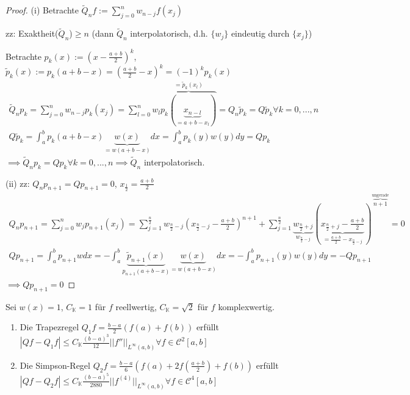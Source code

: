 \begin{proof}
	(i) Betrachte $\tilde{Q}_nf := \sum_{j=0}^{n} w_{n-j} f(x_j)$
	
	zz: Exaktheit($\tilde{Q}_n$)$\geq n$ (dann $\tilde{Q}_n$ interpolatorisch, d.h. $\{w_j\}$ eindeutig durch $\{x_j\}$)
	
	Betrachte $p_k(x) := \left(x - \frac{a+b}{2}\right)^k$, $\tilde{p}_k(x) := p_k(a+b-x) = \left(\frac{a+b}{2} - x\right)^k = (-1)^k p_k(x)$
	\begin{align*}
		\tilde{Q}_np_k = \sum_{j=0}^{n} w_{n-j}p_k(x_j) = \sum_{l=0}^{n} w_l \overbrace{p_k(\underbrace{x_{n-l}}_{=a+b-x_l})}^{=\tilde{p}_k(x_l)} = Q_n\tilde{p}_k = Q\tilde{p}_k \forall k=0, ..., n\\
		Q\tilde{p}_k = \int_{a}^{b} p_k(a+b-x) \underbrace{w(x)}_{=w(a+b-x)} dx = \int_{a}^{b} p_k(y) w(y) dy = Qp_k
	\end{align*}
	$\implies \tilde{Q}_np_k = Qp_k \forall k=0, ..., n \implies \tilde{Q}_n$ interpolatorisch.
	
	(ii) zz: $Q_np_{n+1} = Qp_{n+1} = 0$, $x_{\frac{1}{2}} = \frac{a+b}{2}$
	\begin{align*}
		Q_np_{n+1} = \sum_{j=0}^{n} w_j p_{n+1}(x_j) =
		\sum_{j=1}^{\frac{n}{2}} w_{\frac{n}{2} - j} (x_{\frac{n}{2} - j} - \frac{a+b}{2})^{n+1} +
		\sum_{j=1}^{\frac{n}{2}} \underbrace{w_{\frac{n}{2} + j}}_{w_{\frac{n}{2} - j}}
		\left( \underbrace{x_{\frac{n}{2} + j} - \frac{a+b}{2} }_{= \frac{a+b}{2} - x_{\frac{n}{2} - j}} \right)^{\overbrace{n+1}^{\text{ungerade}}} = 0\\
		Qp_{n+1} = \int_{a}^{b} p_{n+1} w dx = - \int_{a}^{b} \underbrace{\tilde{p}_{n+1}(x)}_{p_{n+1}(a+b-x)} \underbrace{w(x)}_{=w(a+b-x)} dx =
		- \int_{a}^{b} p_{n+1}(y) w(y) dy = - Qp_{n+1}
	\end{align*}
	$\implies Qp_{n+1} = 0$
\end{proof}

\begin{corollary}
	Sei $w(x)=1$, $C_\mathbb{K} = 1$ für $f$ reellwertig, $C_{\mathbb{K}} = \sqrt{2}$ für $f$ komplexwertig.
	\begin{enumerate}
		\item Die Trapezregel $Q_1f = \frac{b-a}{2} (f(a) + f(b))$ erfüllt $|Qf - Q_1f| \leq C_{\mathbb{K}} \frac{(b-a)^3}{12} ||f''||_{L^\infty(a,b)} \forall f \in \mathcal{C}^2[a,b]$
		\item Die Simpson-Regel $Q_2f = \frac{b-a}{6} \left(f(a) + 2f\left(\frac{a+b}{2}\right) + f(b)\right)$ erfüllt $|Qf - Q_2f| \leq C_{\mathbb{K}} \frac{(b-a)^5}{2880} ||f^{(4)}||_{L^\infty(a,b)} \forall f \in \mathcal{C}^4[a,b]$
	\end{enumerate}
\end{corollary}

